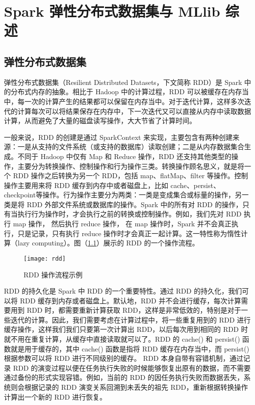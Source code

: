 

\chapter{Spark 弹性分布式数据集与 MLlib 综述}
\label{cha:spark_RDD_mllib}
\section{弹性分布式数据集}
弹性分布式数据集（Resilient Distributed Datasets，下文简称 RDD）\cite{Zaharia2012}是 Spark 中的分布式内存的抽象。相比于 Hadoop 中的计算过程，RDD 可以被缓存在内存当中，每一次的计算产生的结果都可以保留在内存当中。对于迭代计算，这样多次迭代的计算每次可以将结果保存在内存中，下一次迭代又可以直接从内存中读取数据计算，从而避免了大量的磁盘读写操作，大大节省了计算时间。

一般来说，RDD 的创建是通过 SparkContext 来实现，主要包含有两种创建来源：一是从支持的文件系统（或支持的数据库）读取创建；二是从内存数据集合生成。不同于 Hadoop 中仅有 Map 和 Reduce 操作，RDD 还支持其他类型的操作，主要分为转换操作、控制操作和行为操作三类。转换操作顾名思义，就是将一个 RDD 操作之后转换为另一个 RDD，包括 map、flatMap、filter 等操作。控制操作主要用来将 RDD 缓存到内存中或者磁盘上，比如 cache、persist、checkpoint等操作。行为操作主要分为两类：一类是变成集合或标量的操作，另一类是将 RDD 外部文件系统或数据库的操作。Spark 中的所有对 RDD 的操作，只有当执行行为操作时，才会执行之前的转换或控制操作。例如，我们先对 RDD 执行 map 操作， 然后执行 reduce 操作， 在 map 操作时，Spark 并不会真正执行，只是记录，只有执行 reduce 操作时才会真正一起计算。这一特性称为惰性计算（lazy computing）。图（\ref{fig:rdd}）展示的 RDD 的一个操作流程。
\begin{figure}[H]
  \centering
  \texttt{[image: rdd]}
  \caption{RDD 操作流程示例}
  \label{fig:rdd}
\end{figure}
RDD 的持久化是 Spark 中 RDD 的一个重要特性。通过 RDD 的持久化，我们可以将 RDD 缓存到内存或者磁盘上。默认地，RDD 并不会进行缓存，每次计算需要用到 RDD 时，都需要重新计算获取 RDD，这样是非常低效的，特别是对于一些迭代的计算。因此，我们需要考虑在计算过程中，将一些重复用到的 RDD 进行缓存操作，这样我们我们只要第一次计算出 RDD，以后每次用到相同的 RDD 时就不用在重复计算，从缓存中直接读取就可以了。RDD 的 cache() 和 persist() 函数就是用于缓存的，其中 cache() 函数是指将 RDD 缓存在内存当中，而 persist() 根据参数可以将 RDD 进行不同级别的缓存。
RDD 本身自带有容错机制，通过记录 RDD 的演变过程以便在任务执行失败的时候能够恢复出原有的数据，而不需要通过备份的形式实现容错。例如，当前的 RDD 的因任务执行失败而数据丢失，系统则会根据记录的 RDD 演变关系回溯到未丢失的祖先 RDD，重新根据转换操作计算出一个新的 RDD 进行恢复。
